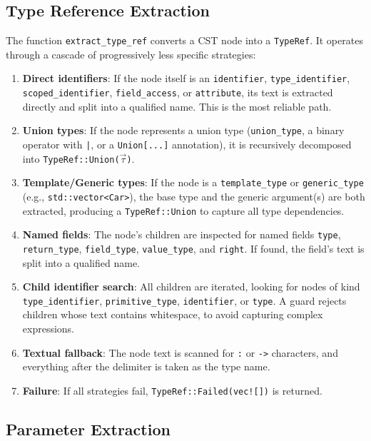 \subsection{Type Reference Extraction}

The function \texttt{extract\_type\_ref} converts a CST node into a
\texttt{TypeRef}. It operates through a cascade of progressively less
specific strategies:

\begin{enumerate}
  \item \textbf{Direct identifiers}: If the node itself is an
    \texttt{identifier}, \texttt{type\_identifier},
    \texttt{scoped\_identifier}, \texttt{field\_access}, or
    \texttt{attribute}, its text is extracted directly and split into
    a qualified name. This is the most reliable path.
  \item \textbf{Union types}: If the node represents a union type
    (\texttt{union\_type}, a binary operator with \texttt{|}, or a
    \texttt{Union[...]} annotation), it is recursively decomposed
    into \texttt{TypeRef::Union($\vec{\tau}$)}.
  \item \textbf{Template/Generic types}: If the node is a
    \texttt{template\_type} or \texttt{generic\_type} (e.g.,
    \texttt{std::vector<Car>}), the base type and the generic
    argument(s) are both extracted, producing a
    \texttt{TypeRef::Union} to capture all type dependencies.
  \item \textbf{Named fields}: The node's children are inspected for
    named fields \texttt{type}, \texttt{return\_type},
    \texttt{field\_type}, \texttt{value\_type}, and \texttt{right}.
    If found, the field's text is split into a qualified name.
  \item \textbf{Child identifier search}: All children are iterated,
    looking for nodes of kind \texttt{type\_identifier},
    \texttt{primitive\_type}, \texttt{identifier}, or \texttt{type}.
    A guard rejects children whose text contains whitespace, to avoid
    capturing complex expressions.
  \item \textbf{Textual fallback}: The node text is scanned for
    \texttt{:} or \texttt{->} characters, and everything after the
    delimiter is taken as the type name.
  \item \textbf{Failure}: If all strategies fail,
    \texttt{TypeRef::Failed(vec![])} is returned.
\end{enumerate}

\subsection{Parameter Extraction}

